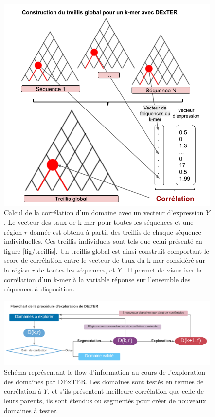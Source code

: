 \documentclass[french]{llncs}
\begin{document}
\begin{figure}[h]
\begin{center}
 	\includegraphics[width=0.7\linewidth]{Images_Dextra/Treillis_global_DExTER.png}
 \caption{Calcul de la corrélation d'un domaine avec un vecteur d'expression $Y$. Le vecteur des taux de k-mer pour toutes les séquences et une région $r$ donnée est obtenu à partir des treillis de chaque séquence individuelles. Ces treillis individuels sont tels que celui présenté en figure \ref{fig/treillis}. Un treillis global est ainsi construit comportant le score de corrélation entre le vecteur de taux du k-mer considéré sur la région $r$ de toutes les séquences, et $Y$ . Il permet de visualiser la corrélation d'un k-mer à la variable réponse sur l'ensemble des séquences à disposition.}
 \label{fig:treillis_global_dexter}
\end{center}
\end{figure}



\begin{figure}[h]
\begin{center}
 	\includegraphics[width = 1\textwidth]{Images_Dextra/DExTER_Flow.png}

 \caption{Schéma représentant le flow d'information au cours de l'exploration des domaines par DExTER. Les domaines sont testés en termes de corrélation à $Y$, et s'ils présentent meilleure corrélation que celle de leurs parents, ils sont étendus ou segmentés pour créer de nouveaux domaines à tester.}
 \label{fig:dexter_flow}
\end{center}
\end{figure}
\end{document}
